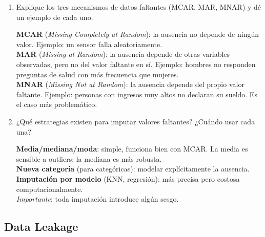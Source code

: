 \documentclass[11pt,a4paper]{article}
\begin{document}
\begin{enumerate}[label=\textbf{P\arabic*.}]

\item Explique los tres mecanismos de datos faltantes (MCAR, MAR, MNAR) y d\'e un ejemplo
  de cada uno.

\begin{answerbox}
\textbf{MCAR} (\textit{Missing Completely at Random}): la ausencia no depende de ning\'un
valor. Ejemplo: un sensor falla aleatoriamente.\\[4pt]
\textbf{MAR} (\textit{Missing at Random}): la ausencia depende de otras variables
observadas, pero no del valor faltante en s\'i. Ejemplo: hombres no responden preguntas
de salud con m\'as frecuencia que mujeres.\\[4pt]
\textbf{MNAR} (\textit{Missing Not at Random}): la ausencia depende del propio valor
faltante. Ejemplo: personas con ingresos muy altos no declaran su sueldo. Es el caso
m\'as problem\'atico.
\end{answerbox}

\item ¿Qu\'e estrategias existen para imputar valores faltantes? ¿Cu\'ando usar cada una?

\begin{answerbox}
\textbf{Media/mediana/moda}: simple, funciona bien con MCAR. La media es sensible a
outliers; la mediana es m\'as robusta.\\
\textbf{Nueva categor\'ia} (para categ\'oricas): modelar expl\'icitamente la ausencia.\\
\textbf{Imputaci\'on por modelo} (KNN, regresión): m\'as precisa pero costosa
computacionalmente.\\[4pt]
\textit{Importante}: toda imputaci\'on introduce alg\'un sesgo.
\end{answerbox}

\end{enumerate}

\subsection{Data Leakage}
\end{document}
